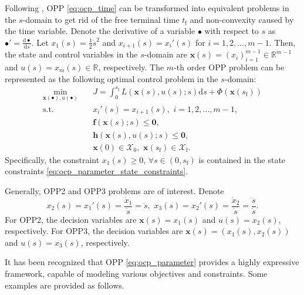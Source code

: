 \documentclass[journal]{IEEEtran}
\theoremstyle{definition}
\theoremstyle{definition}
\newcommand\R{{\mathbb{R}}}
\newcommand\st{{\text{s.t.}}}
\renewcommand\vector[1]{\boldsymbol{#1}}
\newcommand\vf{{\vector{f}}}
\newcommand\vh{{\vector{h}}}
\newcommand\vx{{\vector{x}}}
\newcommand\vzero{{\vector{0}}}
\begin{document}
Following \cite{verscheure2009time,debrouwere2013time}, OPP \eqref{eq:ocp_time} can be transformed into equivalent problems in the $s$-domain to get rid of the free terminal time $t_\text{f}$ and non-convexity caused by the time variable. Denote the derivative of a variable $\bullet$ with respect to $s$ as $\bullet'=\frac{\mathrm{d}\bullet}{\mathrm{d}s}$. Let $x_1(s)=\frac12\dot{s}^2$ and $x_{i+1}(s)=x_i'(s)$ for $i=1,2,\ldots,m-1$. Then, the state and control variables in the $s$-domain are $\vx(s)=(x_i)_{i=1}^{m-1}\in\R^{m-1}$ and $u(s)=x_{m}(s)\in\R$, respectively. The $m$-th order OPP problem can be represented as the following optimal control problem in the $s$-domain:
\begin{subequations}\label{eq:ocp_parameter}
    \begin{align}
        \min_{\vx(\bullet), u(\bullet)} \quad &J = \int_0^{s_\text{f}} L(\vx(s), u(s); s) \mathrm{d}s + \Phi(\vx(s_\text{f})) \label{eq:ocp_parameter_objective}\\
        \st \quad & x_i'(s) = x_{i+1}(s), \,\,i=1,2,\ldots,m-1, \\
        &\vf(\vx(s); s) \leq \vzero,  \label{eq:ocp_parameter_state_constraints}\\
        &\vh(\vx(s), u(s); s) \leq \vzero, \label{eq:ocp_parameter_mix_constraints} \\
        &\vx(0)\in \mathcal{X}_0, \,\, \vx(s_\text{f})\in \mathcal{X}_\text{f}.\label{eq:ocp_parameter_boundary}
    \end{align}
\end{subequations}
Specifically, the constraint $x_1(s)\geq0$, $\forall s\in(0,s_\text{f})$ is contained in the state constraints \eqref{eq:ocp_parameter_state_constraints}.

Generally, OPP2 \cite{verscheure2009time,pham2018new} and OPP3 \cite{debrouwere2013time,wang2026online} problems are of interest. Denote
\begin{equation}\label{eq:state_control_relation}
    x_2(s)=x_1'(s)=\frac{\dot{x}_1}{\dot{s}}=\ddot{s},\,\,x_3(s)=x_2'(s)=\frac{\dot{x}_2}{\dot{s}}=\frac{\dddot{s}}{\dot{s}}.
\end{equation}
For OPP2, the decision variables are $\vx(s)=x_1(s)$ and $u(s)=x_2(s)$, respectively. For OPP3, the decision variables are $\vx(s)=(x_1(s), x_2(s))$ and $u(s)=x_3(s)$, respectively.

It has been recognized that OPP \eqref{eq:ocp_parameter} provides a highly expressive framework, capable of modeling various objectives and constraints. Some examples are provided as follows.
\end{document}
